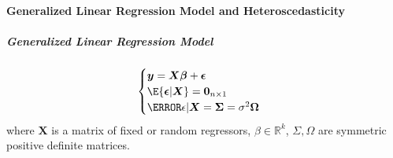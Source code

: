 


\paragraph{Generalized Linear Regression Model and Heteroscedasticity}
\subparagraph{Generalized Linear Regression Model }
$$
\begin{cases}
	\bm{y} = \bm{X}\bm{\beta} + \bm{\epsilon}\\
	\E{\bm{\epsilon}|\bm{X}} = \bm{0}_{n\times 1}\\
	\V{\epsilon|\bm{X}} = \bm{\Sigma} = \sigma^{2}\bm{\Omega}
\end{cases}
$$
where $\bm{X}$ is a matrix of fixed or random regressors, $\beta\in\mathbb{R}^{k}$, $\Sigma,
\Omega$ are symmetric positive definite matrices. 

